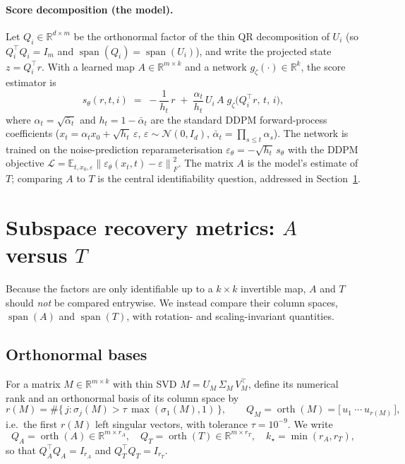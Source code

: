 \documentclass[11pt]{article}
\newcommand{\R}{\mathbb{R}}
\newcommand{\E}{\mathbb{E}}
\newcommand{\norm}[1]{\left\lVert #1 \right\rVert}
\newcommand{\fro}[1]{\norm{#1}_{F}}
\newcommand{\T}{^{\!\top}}
\newcommand{\range}{\operatorname{span}}
\newcommand{\orth}{\operatorname{orth}}
\begin{document}
\paragraph{Score decomposition (the model).}
Let $Q_i\in\R^{d\times m}$ be the orthonormal factor of the thin QR decomposition
of $U_i$ (so $Q_i\T Q_i = I_m$ and $\range(Q_i)=\range(U_i)$), and write the
projected state $z = Q_i\T r$. With a learned map $A\in\R^{m\times k}$ and a
network $g_\zeta(\cdot)\in\R^k$, the score estimator is
\begin{equation}
  s_\theta(r,t,i) \;=\; -\frac{1}{h_t}\,r \;+\; \frac{\alpha_t}{h_t}\,U_i\,A\;
  g_\zeta\!\bigl(Q_i\T r,\,t,\,i\bigr),
  \label{eq:score}
\end{equation}
where $\alpha_t=\sqrt{\bar\alpha_t}$ and $h_t = 1-\bar\alpha_t$ are the standard
DDPM forward-process coefficients ($x_t=\alpha_t x_0+\sqrt{h_t}\,\varepsilon$,
$\varepsilon\sim\mathcal N(0,I_d)$, $\bar\alpha_t=\prod_{s\le t}\alpha_s$).
The network is trained on the noise-prediction reparameterisation
$\varepsilon_\theta = -\sqrt{h_t}\,s_\theta$ with the DDPM objective
$\mathcal L = \E_{t,x_0,\varepsilon}\fro{\varepsilon_\theta(x_t,t)-\varepsilon}^2$.
The matrix $A$ is the model's estimate of $T$; comparing $A$ to $T$ is the central
identifiability question, addressed in Section~\ref{sec:subspace}.

\section{Subspace recovery metrics: \texorpdfstring{$A$}{A} versus \texorpdfstring{$T$}{T}}
\label{sec:subspace}

Because the factors are only identifiable up to a $k\times k$ invertible map,
$A$ and $T$ should \emph{not} be compared entrywise. We instead compare their
column spaces, $\range(A)$ and $\range(T)$, with rotation- and scaling-invariant
quantities.

\subsection{Orthonormal bases}
For a matrix $M\in\R^{m\times k}$ with thin SVD $M = U_M\,\Sigma_M\,V_M\T$, define
its numerical rank and an orthonormal basis of its column space by
\begin{equation}
  r(M) = \#\bigl\{\, j : \sigma_j(M) > \tau\,\max(\sigma_1(M),1) \,\bigr\},
  \qquad
  Q_M = \orth(M) = \bigl[\,u_1\ \cdots\ u_{r(M)}\,\bigr],
\end{equation}
i.e.\ the first $r(M)$ left singular vectors, with tolerance $\tau = 10^{-9}$.
We write
\begin{equation}
  Q_A = \orth(A)\in\R^{m\times r_A},\quad
  Q_T = \orth(T)\in\R^{m\times r_T},\quad
  k_\star = \min(r_A, r_T),
\end{equation}
so that $Q_A\T Q_A = I_{r_A}$ and $Q_T\T Q_T = I_{r_T}$.
\end{document}
